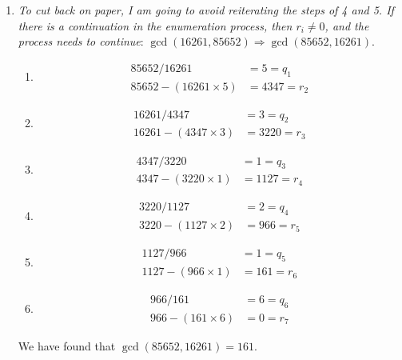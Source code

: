 {\begin{enumerate}
\begin{enumerate}[label=(\arabic*)]
\begin{align*}
            18 / 3 &= 6 = q_4 \\
            18 - (3 \times 6) &= 0 = r_5
        \end{align*}
        \item $r_4 = 0$. So, we stop.
    \end{enumerate}
    We have found that the greatest common divisor is $3$.
    \item \textit{To cut back on paper, I am going to avoid reiterating the steps of 4 and 5. If there is a continuation in the enumeration process, then $r_i \ne 0$, and the process needs to continue}: $\gcd(16261,85652) \Rightarrow \gcd(85652,16261)$.
    \begin{enumerate}[label=(\arabic*)]
    \item
    \begin{align*}
        85652 / 16261 &= 5 = q_1 \\
        85652 - (16261 \times 5) &= 4347 = r_2
    \end{align*}
    \item 
    \begin{align*}
        16261 / 4347 &= 3 = q_2 \\
        16261 - (4347 \times 3) &= 3220 = r_3
    \end{align*}
    \item 
    \begin{align*}
        4347 / 3220 &= 1 = q_3 \\
        4347 - (3220 \times 1) &= 1127 = r_4
    \end{align*}
    \item 
    \begin{align*}
        3220 / 1127 &= 2 = q_4 \\
        3220 - (1127 \times 2) &= 966 = r_5
    \end{align*}
    \item 
    \begin{align*}
        1127 / 966 &= 1 = q_5 \\
        1127 - (966 \times 1) &= 161 = r_6
    \end{align*}
    \item 
    \begin{align*}
        966 / 161 &= 6 = q_6 \\
        966 - (161 \times 6) &= 0 = r_7 
    \end{align*}
    \end{enumerate}
    We have found that $\gcd(85652,16261) = 161$.
    
\end{enumerate}
}

